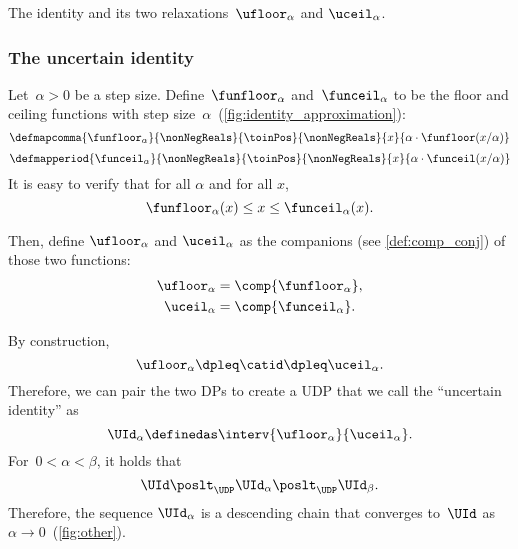 \begin{marginfigure}
    \centering



    \caption{
        The identity and its two relaxations~$\ufloor_{\alpha}$ and $\uceil_{\alpha}$.
    }
    \label{fig:identity_approximation}
\end{marginfigure}

\subsubsection{The uncertain identity}

Let~$\alpha>0$ be a step size.
Define~$\funfloor_{\alpha}$ and~$\funceil_{\alpha}$ to be the floor and ceiling functions with step size~$\alpha$~(\cref{fig:identity_approximation}):
\begin{equation}
    \defmapcomma{
        \funfloor_{\alpha}
    }{
        \nonNegReals
    }{
        \toinPos
    }{
        \nonNegReals
    }{
        x
    }{
        \alpha \cdot \funfloor(x/\alpha)
    }
\end{equation}
\begin{equation}
    \defmapperiod{
        \funceil_{\alpha}
    }{
        \nonNegReals
    }{
        \toinPos
    }{
        \nonNegReals
    }{
        x
    }{
        \alpha \cdot \funceil(x/\alpha)
    }
\end{equation}
It is easy to verify that for all $\alpha$ and for all $x$,
\begin{equation}
    \funfloor_{\alpha}(x) \leq x \leq \funceil_{\alpha}(x).
\end{equation}

Then, define $\ufloor_{\alpha}$ and $\uceil_\alpha$ as the companions (see \cref{def:comp_conj}) of those two functions:
\begin{align}
    \ufloor_{\alpha} & = \comp{\funfloor_\alpha}, \\
    \uceil_{\alpha}  & = \comp{\funceil_\alpha} .
\end{align}

By construction,
\begin{equation}
    \ufloor_{\alpha}\dpleq\catid\dpleq\uceil_{\alpha}.
\end{equation}
Therefore, we can pair the two DPs to create a UDP that we call the ``uncertain identity'' as
\begin{equation}
    \UId_{\alpha}\definedas \interv {\ufloor_{\alpha}} {\uceil_{\alpha}}.
\end{equation}
For~$0<\alpha<\beta$, it holds that
%
\begin{equation}
    \UId\poslt_{\UDP}\UId_{\alpha}\poslt_{\UDP}\UId_{\beta}.
\end{equation}
%
Therefore, the sequence $\UId_{\alpha}$ is a descending chain that converges to~$\UId$ as~$\alpha\to0$~(\cref{fig:other}).

